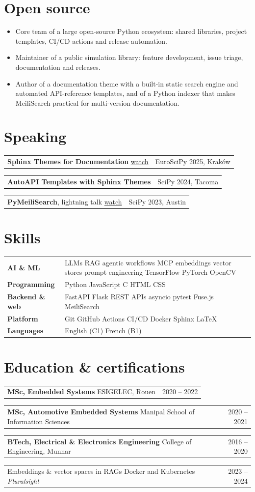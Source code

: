 \documentclass[10.5pt, a4paper]{article}
\makeatletter
\newcommand{\row}[2]{%
    \begin{tabularx}{\textwidth}{@{}Xr@{}}
        #1 & \small\color{subtle}#2 \\
    \end{tabularx}}
\newcommand{\skill}[2]{\textbf{\small #1} & \small #2 \\[0.55ex]}
\newcommand{\sep}{\;\textcolor{hairline}{\textbullet}\;}
\makeatother
\begin{document}
\section{Open source}
\begin{itemize}
    \item Core team of a large open-source Python ecosystem: shared libraries, project templates, CI/CD actions and release automation.
    \item Maintainer of a public simulation library: feature development, issue triage, documentation and releases.
    \item Author of a documentation theme with a built-in static search engine and automated API-reference templates, and of a Python indexer that makes MeiliSearch practical for multi-version documentation.
\end{itemize}

\section{Speaking}

\row{\textbf{Sphinx Themes for Documentation} \sep \href{https://youtu.be/QU8YCFO6qWM?t=4099}{watch}}{EuroSciPy 2025, Krak\'ow}
\row{\textbf{AutoAPI Templates with Sphinx Themes}}{SciPy 2024, Tacoma}
\row{\textbf{PyMeiliSearch}, lightning talk \sep \href{https://youtu.be/RuIk3Wq2Pg0}{watch}}{SciPy 2023, Austin}

\section{Skills}

\begin{tabularx}{\textwidth}{@{}p{26mm}X@{}}
\skill{AI \& ML}{LLMs \sep RAG \sep agentic workflows \sep MCP \sep embeddings \sep vector stores \sep prompt engineering \sep TensorFlow \sep PyTorch \sep OpenCV}
\skill{Programming}{Python \sep JavaScript \sep C \sep HTML \sep CSS}
\skill{Backend \& web}{FastAPI \sep Flask \sep REST APIs \sep asyncio \sep pytest \sep Fuse.js \sep MeiliSearch}
\skill{Platform}{Git \sep GitHub Actions \sep CI/CD \sep Docker \sep Sphinx \sep LaTeX}
\skill{Languages}{English (C1) \sep French (B1)}
\end{tabularx}

\section{Education \& certifications}

\row{\textbf{MSc, Embedded Systems} \sep ESIGELEC, Rouen}{2020 -- 2022}
\row{\textbf{MSc, Automotive Embedded Systems} \sep Manipal School of Information Sciences}{2020 -- 2021}
\row{\textbf{BTech, Electrical \& Electronics Engineering} \sep College of Engineering, Munnar}{2016 -- 2020}

\vspace{0.6ex}
\row{Embeddings \& vector spaces in RAGs \sep Docker and Kubernetes \sep \textit{Pluralsight}}{2023 -- 2024}
\end{document}
